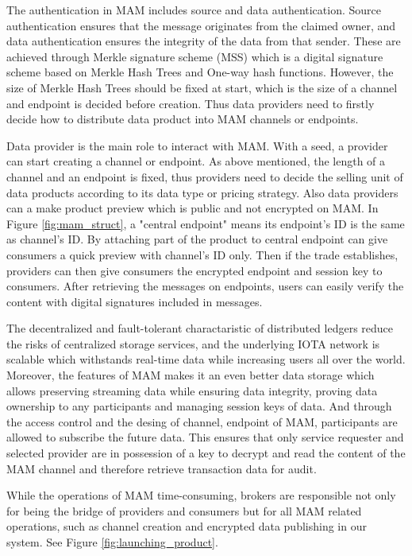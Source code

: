 \documentclass[journal,article,applsci,submit,moreauthors,pdftex]{Definitions/mdpi}
\begin{document}
\begin{itemize}[leftmargin=*,labelsep=5.8mm]
The authentication in MAM includes source and data authentication. Source authentication ensures that the message originates from the claimed owner, and data authentication ensures the integrity of the data from that sender. These are achieved through Merkle signature scheme\cite{MSS} (MSS) which is a digital signature scheme based on Merkle Hash Trees and One-way hash functions. However, the size of Merkle Hash Trees should be fixed at start, which is the size of a channel and endpoint is decided before creation. Thus data providers need to firstly decide how to distribute data product into MAM channels or endpoints.

Data provider is the main role to interact with MAM. With a seed, a provider can start creating a channel or endpoint. As above mentioned, the length of a channel and an endpoint is fixed, thus providers need to decide the selling unit of data products according to its data type or pricing strategy. Also data providers can a make product preview which is public and not encrypted on MAM. In Figure \ref{fig:mam_struct}, a "central endpoint" means its endpoint's ID is the same as channel's ID. By attaching part of the product to central endpoint can give consumers a quick preview with channel's ID only. Then if the trade establishes, providers can then give consumers the encrypted endpoint and session key to consumers. After retrieving the messages on endpoints, users can easily verify the content with digital signatures included in messages. 

The decentralized and fault-tolerant charactaristic of distributed ledgers reduce the risks of centralized storage services, and the underlying IOTA network is scalable which withstands real-time data while increasing users all over the world. Moreover, the features of MAM makes it an even better data storage which allows preserving streaming data while ensuring data integrity, proving data ownership to any participants and managing session keys of data. And through the access control and the desing of channel, endpoint of MAM, participants are allowed to subscribe the future data. This ensures that only service requester and selected provider are in possession of a key to decrypt and read the content of the MAM channel and therefore retrieve transaction data for audit.

While the operations of MAM time-consuming, brokers are responsible not only for being the bridge of providers and consumers but for all MAM related operations, such as channel creation and encrypted data publishing in our system. See Figure \ref{fig:launching_product}.


\end{itemize}
\end{document}
